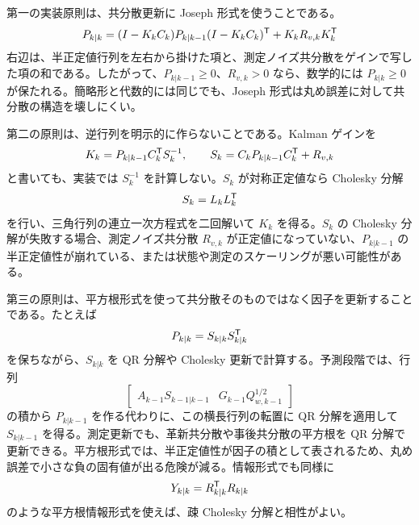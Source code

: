 第一の実装原則は、共分散更新に Joseph 形式を使うことである。
\begin{equation}
  P_{k|k}
  =(I-K_kC_k)P_{k|k-1}(I-K_kC_k)^{\mathsf{T}}+K_kR_{v,k}K_k^{\mathsf{T}}
  \label{eq:stable-joseph-form}
\end{equation}
右辺は、半正定値行列を左右から掛けた項と、測定ノイズ共分散をゲインで写した項の和である。したがって、$P_{k|k-1}\ge0$、$R_{v,k}>0$ なら、数学的には $P_{k|k}\ge0$ が保たれる。簡略形と代数的には同じでも、Joseph 形式は丸め誤差に対して共分散の構造を壊しにくい。

第二の原則は、逆行列を明示的に作らないことである。Kalman ゲインを
\begin{equation}
  K_k=P_{k|k-1}C_k^{\mathsf{T}} S_k^{-1},
  \qquad
  S_k=C_kP_{k|k-1}C_k^{\mathsf{T}}+R_{v,k}
\end{equation}
と書いても、実装では $S_k^{-1}$ を計算しない。$S_k$ が対称正定値なら Cholesky 分解
\begin{equation}
  S_k=L_kL_k^{\mathsf{T}}
\end{equation}
を行い、三角行列の連立一次方程式を二回解いて $K_k$ を得る。$S_k$ の Cholesky 分解が失敗する場合、測定ノイズ共分散 $R_{v,k}$ が正定値になっていない、$P_{k|k-1}$ の半正定値性が崩れている、または状態や測定のスケーリングが悪い可能性がある。

第三の原則は、平方根形式を使って共分散そのものではなく因子を更新することである。たとえば
\begin{equation}
  P_{k|k}=S_{k|k}S_{k|k}^{\mathsf{T}}
\end{equation}
を保ちながら、$S_{k|k}$ を QR 分解や Cholesky 更新で計算する。予測段階では、行列
\begin{equation}
  \begin{bmatrix}
    A_{k-1}S_{k-1|k-1} & G_{k-1}Q_{w,k-1}^{1/2}
  \end{bmatrix}
\end{equation}
の積から $P_{k|k-1}$ を作る代わりに、この横長行列の転置に QR 分解を適用して $S_{k|k-1}$ を得る。測定更新でも、革新共分散や事後共分散の平方根を QR 分解で更新できる。平方根形式では、半正定値性が因子の積として表されるため、丸め誤差で小さな負の固有値が出る危険が減る。情報形式でも同様に
\begin{equation}
  Y_{k|k}=R_{k|k}^{\mathsf{T}} R_{k|k}
\end{equation}
のような平方根情報形式を使えば、疎 Cholesky 分解と相性がよい。

